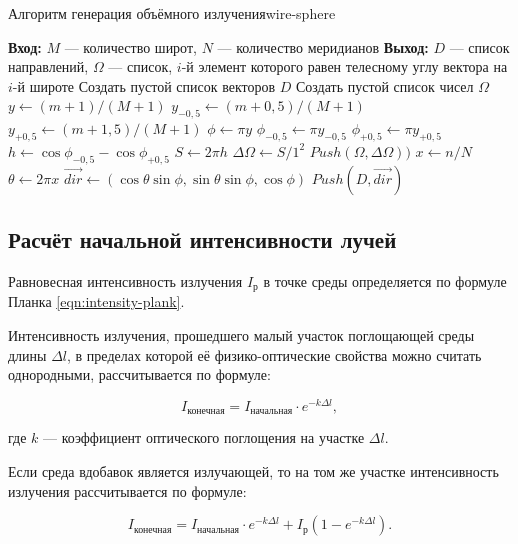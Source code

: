 \begin{Algorithm}{Алгоритм генерация объёмного излучения}{wire-sphere}
	\begin{algorithmic}[1]
		\State \textbf{Вход:} $M$ — количество широт, $N$ — количество меридианов
		\State \textbf{Выход:} $D$ — список направлений, $\Omega$ — список, $i$-й элемент которого равен телесному углу вектора на $i$-й широте
		\State Создать пустой список векторов $D$
		\State Создать пустой список чисел $\Omega$
			\State $y \gets (m + 1) / (M + 1)$
			\State $y_{-0,5} \gets (m + 0,5) / (M + 1)$
			\State $y_{+0,5} \gets (m + 1,5) / (M + 1)$
			\State $\phi \gets \pi y$
			\State $\phi_{-0,5} \gets \pi y_{-0,5}$
			\State $\phi_{+0,5} \gets \pi y_{+0,5}$
			\State $h \gets \cos{\phi_{-0,5}} - \cos{\phi_{+0,5}}$
			\State $S \gets 2\pi h$
			\State $\Delta\Omega \gets S / 1^2$
			\State $Push(\Omega, \Delta\Omega))$
				\State $x \gets n / N$
				\State $\theta \gets 2 \pi x$
				\State $\overrightarrow{dir} \gets (\cos\theta \sin\phi, \sin\theta \sin\phi, \cos\phi)$
				\State $Push(D, \overrightarrow{dir})$

			\EndFor
		\EndFor
	\end{algorithmic}
\end{Algorithm}

\subsection{Расчёт начальной интенсивности лучей}

Равновесная интенсивность излучения $I_{\text{р}}$ в точке среды определяется по формуле Планка \eqref{eqn:intensity-plank}.

Интенсивность излучения, прошедшего малый участок поглощающей среды длины $\Delta l$, в пределах которой её физико-оптические свойства можно считать однородными, рассчитывается по формуле:

\begin{equation}
	I_{\text{конечная}} = I_{\text{начальная}} \cdot e^{-k\Delta l},
\end{equation}

\noindent где $k$ — коэффициент оптического поглощения на участке $\Delta l$.

Если среда вдобавок является излучающей, то на том же участке интенсивность излучения рассчитывается по формуле:

\begin{equation}
	I_{\text{конечная}} = I_{\text{начальная}} \cdot e^{-k\Delta l} + I_{\text{р}}\left(1 - e^{-k \Delta l} \right).
\end{equation}

